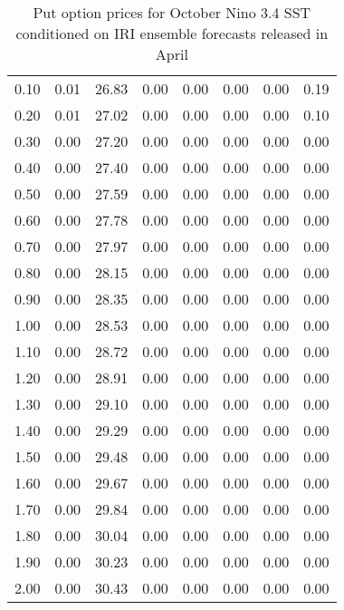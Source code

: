 \begin{table*}[ht]
\begin{tabular}{rrrrrrrr}
  0.10 & 0.01 & 26.83 & 0.00 & 0.00 & 0.00 & 0.00 & 0.19 \\ 
  0.20 & 0.01 & 27.02 & 0.00 & 0.00 & 0.00 & 0.00 & 0.10 \\ 
  0.30 & 0.00 & 27.20 & 0.00 & 0.00 & 0.00 & 0.00 & 0.00 \\ 
  0.40 & 0.00 & 27.40 & 0.00 & 0.00 & 0.00 & 0.00 & 0.00 \\ 
  0.50 & 0.00 & 27.59 & 0.00 & 0.00 & 0.00 & 0.00 & 0.00 \\ 
  0.60 & 0.00 & 27.78 & 0.00 & 0.00 & 0.00 & 0.00 & 0.00 \\ 
  0.70 & 0.00 & 27.97 & 0.00 & 0.00 & 0.00 & 0.00 & 0.00 \\ 
  0.80 & 0.00 & 28.15 & 0.00 & 0.00 & 0.00 & 0.00 & 0.00 \\ 
  0.90 & 0.00 & 28.35 & 0.00 & 0.00 & 0.00 & 0.00 & 0.00 \\ 
  1.00 & 0.00 & 28.53 & 0.00 & 0.00 & 0.00 & 0.00 & 0.00 \\ 
  1.10 & 0.00 & 28.72 & 0.00 & 0.00 & 0.00 & 0.00 & 0.00 \\ 
  1.20 & 0.00 & 28.91 & 0.00 & 0.00 & 0.00 & 0.00 & 0.00 \\ 
  1.30 & 0.00 & 29.10 & 0.00 & 0.00 & 0.00 & 0.00 & 0.00 \\ 
  1.40 & 0.00 & 29.29 & 0.00 & 0.00 & 0.00 & 0.00 & 0.00 \\ 
  1.50 & 0.00 & 29.48 & 0.00 & 0.00 & 0.00 & 0.00 & 0.00 \\ 
  1.60 & 0.00 & 29.67 & 0.00 & 0.00 & 0.00 & 0.00 & 0.00 \\ 
  1.70 & 0.00 & 29.84 & 0.00 & 0.00 & 0.00 & 0.00 & 0.00 \\ 
  1.80 & 0.00 & 30.04 & 0.00 & 0.00 & 0.00 & 0.00 & 0.00 \\ 
  1.90 & 0.00 & 30.23 & 0.00 & 0.00 & 0.00 & 0.00 & 0.00 \\ 
  2.00 & 0.00 & 30.43 & 0.00 & 0.00 & 0.00 & 0.00 & 0.00 \\ 
   \hline
\end{tabular}
\caption{Put option prices for October Nino 3.4 SST conditioned on IRI ensemble forecasts released in April} 
\end{table*}

